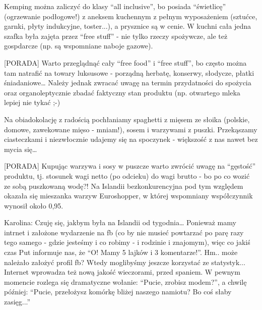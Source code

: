 \documentclass[12pt,a4paper,leqno]{book}
\newcommand{\hint}[1] {
	\vspace{6pt}
	[PORADA] #1
	\vspace{6pt}
}
\begin{document}
Kemping można zaliczyć do klasy “all inclusive”, bo posiada “świetlicę” (ogrzewanie podłogowe!) z aneksem kuchennym z pełnym wyposażeniem (sztućce, garnki, płyty indukcyjne, toster...), a prysznice są w cenie. W kuchni cała jedna szafka była zajęta przez “free stuff” - nie tylko rzeczy spożywcze, ale też gospdarcze (np. są wspomniane naboje gazowe).

\hint{Warto przeglądnąć cały “free food” i “free stuff”, bo często można tam natrafić na towary luksusowe - porządną herbatę, konserwy, słodycze, płatki śniadaniowe… Należy jednak zwracać uwagę na termin przydatności do spożycia oraz organoleptycznie zbadać faktyczny stan produktu (np. otwartego mleka lepiej nie tykać ;-)}

Na obiadokolację z radością pochłaniamy spaghetti z mięsem ze słoika (polskie, domowe, zawekowane mięso - mniam!), sosem i warzywami z puszki. Przekąszamy ciasteczkami i niezwłocznie udajemy się na spoczynek - większość z nas nawet bez mycia się…

\hint{Kupując warzywa i sosy w puszcze warto zwrócić uwagę na “gęstość” produktu, tj. stosunek wagi netto (po odcieku) do wagi brutto - bo po co wozić ze sobą puszkowaną wodę?! Na Islandii bezkonkurencyjna pod tym względem okazała się mieszanka warzyw Euroshopper, w której wspomniany współczynnik wynosił około 0,95.}

Karolina: Czuję się, jakbym była na Islandii od tygodnia…
Ponieważ mamy intrnet i założone wydarzenie na fb (co by nie musieć powtarzać po parę razy tego samego - gdzie jesteśmy i co robimy - i rodzinie i znajomym), więc co jakiś czas Put informuje nas, że “O! Mamy 5 lajków i 3 komentarze!”. Hm.. może należało założyć profil fb? Wtedy moglibyśmy jeszcze korzystać ze statystyk...
Internet wprowadza też nową jakość wieczorami, przed spaniem. W pewnym momencie rozlega się dramatyczne wołanie: “Pucie, zrobisz modem?”, a chwilę później: “Pucie, przełożysz komórkę bliżej naszego namiotu? Bo coś słaby zasięg...”
\end{document}
